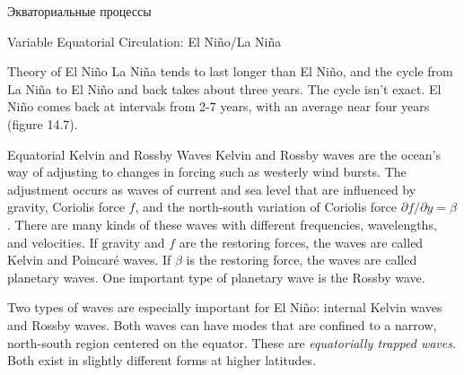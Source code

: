 \begin{chapter}{Экваториальные процессы}
\begin{section}{Variable Equatorial Circulation: El Ni\~{n}o/La Ni\~{n}a}
\begin{paragraph}{Theory of El Ni\~{n}o}
La Ni\~{n}a tends to last longer than El Ni\~{n}o, and the cycle from
La Ni\~{n}a to El Ni\~{n}o and back takes about three years. The cycle
isn't exact. El Ni\~{n}o comes back at intervals from 2-7 years, with
an average near four years (figure 14.7).
%
\end{paragraph}

\begin{paragraph}{Equatorial Kelvin and Rossby Waves}
Kelvin and Rossby waves are the ocean's way of
adjusting to changes in forcing such as westerly wind bursts. The
adjustment occurs as waves of current and sea level that are
influenced by gravity, Coriolis force $f$, and the north-south
variation of Coriolis force $\partial f/\partial y = \beta$. There are
many kinds of these waves with different frequencies, wavelengths, and
velocities. If gravity and $f$ are the restoring forces, the waves are
called Kelvin and Poincar\'{e} waves. If $\beta $ is the restoring
force, the waves are called planetary waves. One important type of
planetary wave is the Rossby wave.
%

Two types of waves are especially important for El Ni\~{n}o: internal
Kelvin waves and Rossby
waves. Both waves can have modes that are confined to a narrow,
north-south region centered on the equator. These are
\textit{equatorially trapped waves}. Both exist in slightly different forms at higher
latitudes.
%


\end{paragraph}
\end{section}
\end{chapter}
